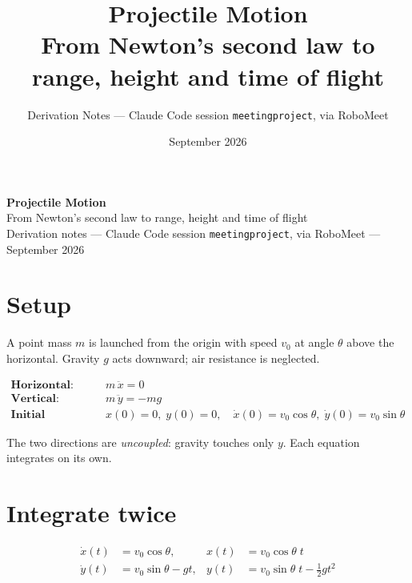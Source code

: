 \documentclass[10pt]{article}
\title{Projectile Motion\\[3pt]
\large From Newton's second law to range, height and time of flight}
\author{Derivation Notes --- Claude Code session \texttt{meetingproject}, via RoboMeet}
\date{September 2026}
\begin{document}
\begin{center}{\Large\bfseries Projectile Motion}\\[2pt]{\normalsize From Newton's second law to range, height and time of flight}\\[2pt]{\small Derivation notes --- Claude Code session \texttt{meetingproject}, via RoboMeet --- September 2026}\end{center}
\vspace{-0.6em}
\setlength{\parskip}{1pt}
\setlength{\abovedisplayskip}{3pt}\setlength{\belowdisplayskip}{3pt}
\small

\section{Setup}

A point mass $m$ is launched from the origin with speed $v_0$ at angle $\theta$ above the horizontal.
Gravity $g$ acts downward; air resistance is neglected.

\begin{tcolorbox}[colback=blue!5, colframe=blue!50!black, title={Governing equations (Newton's second law, per component)}, boxsep=2pt, top=2pt, bottom=2pt]
\begin{align}
  \textbf{Horizontal:}& \quad m\,\ddot{x} = 0 \label{eq:x}\\[2pt]
  \textbf{Vertical:}& \quad m\,\ddot{y} = -m g \label{eq:y}\\[2pt]
  \textbf{Initial conditions:}& \quad x(0)=0,\; y(0)=0,\quad
    \dot{x}(0)=v_0\cos\theta,\; \dot{y}(0)=v_0\sin\theta
\end{align}
\end{tcolorbox}

\noindent
The two directions are \emph{uncoupled}: gravity touches only $y$. Each equation integrates on its own.

\section{Integrate twice}

\begin{align}
  \dot{x}(t) &= v_0\cos\theta, &
  x(t) &= v_0\cos\theta\; t \label{eq:xt}\\[3pt]
  \dot{y}(t) &= v_0\sin\theta - g t, &
  y(t) &= v_0\sin\theta\; t - \tfrac{1}{2} g t^2 \label{eq:yt}
\end{align}
\end{document}
